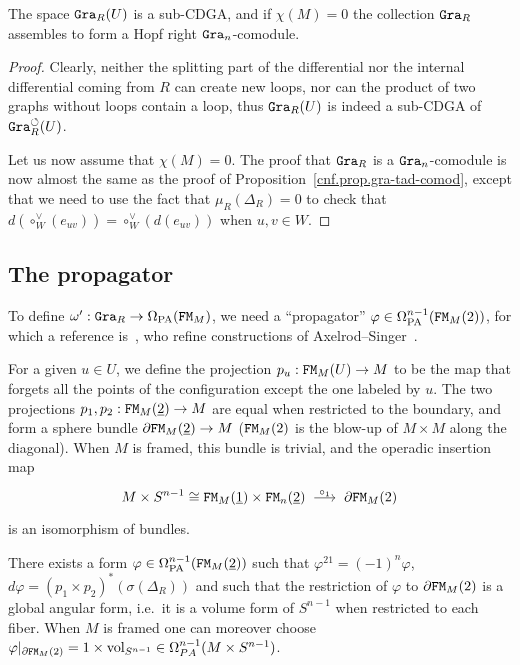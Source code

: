 \begin{proposition}
  The space $\mathtt{Gra}_{R}(U)$ is a sub-CDGA, and if $\chi(M) = 0$ the collection $\mathtt{Gra}_{R}$ assembles to form a Hopf right $\mathtt{Gra}_{n}$-comodule.
\end{proposition}
\begin{proof}
  Clearly, neither the splitting part of the differential nor the internal differential coming from $R$ can create new loops, nor can the product of two graphs without loops contain a loop, thus $\mathtt{Gra}_{R}(U)$ is indeed a sub-CDGA of $\mathtt{Gra}_{R}^{\circlearrowleft}(U)$.

  Let us now assume that $\chi(M) = 0$.
  The proof that $\mathtt{Gra}_{R}$ is a $\mathtt{Gra}_{n}$-comodule is now almost the same as the proof of Proposition~\ref{cnf.prop.gra-tad-comod}, except that we need to use the fact that $\mu_{R}(\Delta_{R}) = 0$ to check that $d(\circ_{W}^{\vee}(e_{uv})) = \circ^{\vee}_{W}(d(e_{uv}))$ when $u,v \in W$.
\end{proof}

\subsection{The propagator}
\label{cnf.sec.propagator}

To define $\omega' : \mathtt{Gra}_{R} \to \Omega_{\mathrm{PA}}(\mathtt{FM}_{M})$, we need a ``propagator'' $\varphi \in \Omega_{\mathrm{PA}}^{n-1}(\mathtt{FM}_{M}(2))$, for which a reference is~\cite[Section 4]{CattaneoMneev2010}, who refine constructions of Axelrod--Singer~\cite{AxelrodSinger1994}.

For a given $u \in U$, we define the projection $p_{u} : \mathtt{FM}_{M}(U) \to M$ to be the map that forgets all the points of the configuration except the one labeled by $u$.
The two projections $p_{1} , p_{2} : \mathtt{FM}_{M}(\underline{2}) \to M$ are equal when restricted to the boundary, and form a sphere bundle $\partial \mathtt{FM}_{M}(\underline{2}) \to M$ ($\mathtt{FM}_{M}(2)$ is the blow-up of $M \times M$ along the diagonal).
When $M$ is framed, this bundle is trivial, and the operadic insertion map
\[ M \times S^{n-1} \cong \FM_{M}(\underline{1}) \times \FM_{n}(\underline{2}) \tkrightarrow{\circ_{1}} \partial \FM_{M}(2) \]
is an isomorphism of bundles.

\begin{proposition}
  \label{cnf.def.propagator}
  There exists a form $\varphi \in \Omega_{\mathrm{PA}}^{n-1}(\mathtt{FM}_{M}(\underline{2}))$ such that $\varphi^{21} = (-1)^{n} \varphi$, $d \varphi = (p_{1} \times p_{2})^{*}(\sigma(\Delta_{R}))$ and such that the restriction of $\varphi$ to $\partial \mathtt{FM}_{M}(2)$ is a global angular form, i.e.\ it is a volume form of $S^{n-1}$ when restricted to each fiber.
  When $M$ is framed one can moreover choose $\varphi|_{\partial \mathtt{FM}_{M}(2)} = 1 \times \mathrm{vol}_{S^{n-1}} \in \Omega^{n-1}_{PA}(M \times S^{n-1})$.
\end{proposition}

